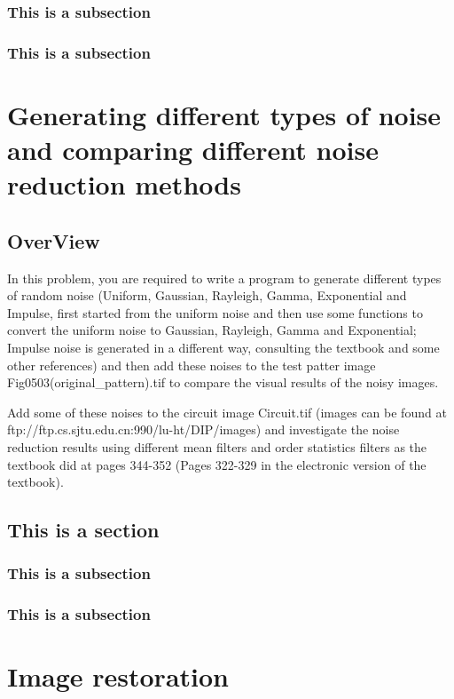 \documentclass[11pt,oneside]{book}
\begin{document}
\subsection{This is a subsection}
\subsection{This is a subsection}

\chapter{Generating different types of noise and comparing different noise reduction methods}
\section{OverView}
In this problem, you are required to write a program to generate different types of random noise (Uniform, Gaussian, Rayleigh, Gamma, Exponential and Impulse, first started from the uniform noise and then use some functions to convert the uniform noise to Gaussian, Rayleigh, Gamma and Exponential; Impulse noise is generated in a different way, consulting the textbook and some other references) and then add these noises to the test patter image Fig0503(original\_pattern).tif to compare the visual results of the noisy images.

Add some of these noises to the circuit image Circuit.tif (images can be found at ftp://ftp.cs.sjtu.edu.cn:990/lu-ht/DIP/images) and investigate the noise reduction results using different mean filters and order statistics filters as the textbook did at pages 344-352 (Pages 322-329 in the electronic version of the textbook).

\section{This is a section}
\subsection{This is a subsection}
\subsection{This is a subsection}

\chapter{Image restoration}
\end{document}
